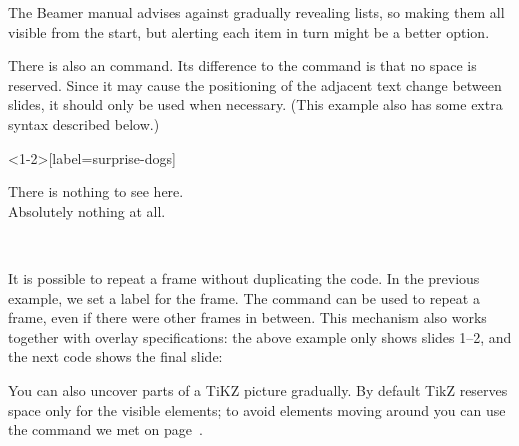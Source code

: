 \begin{practices}
The Beamer manual advises against gradually revealing lists,
so making them all visible from the start,
but alerting each item in turn might be a better option.
\end{practices}


There is also an  command.
Its difference to the  command is that no space is reserved.
Since it may cause the positioning of the adjacent text change
between slides, it should only be used when necessary.
(This example also has some extra syntax described below.)
%
\begin{ExampleCode}
\begin{frame}<1-2>[label=surprise-dogs]

There is nothing to see here.\\
Absolutely nothing at all.\\

\end{frame}
\end{ExampleCode}
%
\begin{center}
~
\end{center}

It is possible to repeat a frame without duplicating the code.
In the previous example, we set a label for the frame.
The  command can be used to repeat a frame,
even if there were other frames in between.
This mechanism also works together with overlay specifications:
the above example only shows slides 1--2, and the next code shows the final slide:
%
\begin{ExampleCode}
\end{ExampleCode}
%
\begin{center}
\end{center}


\begin{remark}
You can also uncover parts of a TiKZ picture gradually.
By default TikZ reserves space only for the visible elements;
to avoid elements moving around you can use the  command
we met on page~\pageref{ex:tikz useasboundingbox}.
\end{remark}


